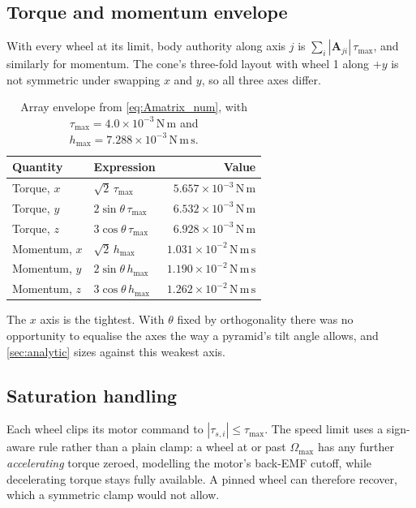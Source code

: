 \documentclass[conference,10pt,a4paper]{IEEEtran}
\newcommand{\mat}[1]{\bm{#1}}
\newcommand{\unit}[1]{\ensuremath{\,\mathrm{#1}}}
\begin{document}
\subsection{Torque and momentum envelope}
\label{sec:envelope}

With every wheel at its limit, body authority along axis $j$ is
$\sum_i|\mat{A}_{ji}|\,\tau_\text{max}$, and similarly for momentum. The
cone's three-fold layout with wheel 1 along $+y$ is not symmetric under
swapping $x$ and $y$, so all three axes differ.

\begin{table}[!t]
\centering
\caption{Array envelope from \cref{eq:Amatrix_num}, with
$\tau_\text{max}=4.0\times10^{-3}\unit{N\,m}$ and
$h_\text{max}=7.288\times10^{-3}\unit{N\,m\,s}$.}
\label{tab:envelope}
\footnotesize
\begin{tabular}{@{}llr@{}}
\toprule
\textbf{Quantity} & \textbf{Expression} & \textbf{Value} \\
\midrule
Torque, $x$   & $\sqrt{2}\,\tau_\text{max}$    & $5.657\times10^{-3}\unit{N\,m}$ \\
Torque, $y$   & $2\sin\theta\,\tau_\text{max}$ & $6.532\times10^{-3}\unit{N\,m}$ \\
Torque, $z$   & $3\cos\theta\,\tau_\text{max}$ & $6.928\times10^{-3}\unit{N\,m}$ \\
Momentum, $x$ & $\sqrt{2}\,h_\text{max}$       & $1.031\times10^{-2}\unit{N\,m\,s}$ \\
Momentum, $y$ & $2\sin\theta\,h_\text{max}$    & $1.190\times10^{-2}\unit{N\,m\,s}$ \\
Momentum, $z$ & $3\cos\theta\,h_\text{max}$    & $1.262\times10^{-2}\unit{N\,m\,s}$ \\
\bottomrule
\end{tabular}
\end{table}

The $x$ axis is the tightest. With $\theta$ fixed by orthogonality there was no
opportunity to equalise the axes the way a pyramid's tilt angle allows, and
\cref{sec:analytic} sizes against this weakest axis.

\subsection{Saturation handling}
\label{sec:sathandling}

Each wheel clips its motor command to $|\tau_{s,i}|\le\tau_\text{max}$. The
speed limit uses a sign-aware rule rather than a plain clamp: a wheel at or
past $\Omega_\text{max}$ has any further \emph{accelerating} torque zeroed,
modelling the motor's back-EMF cutoff, while decelerating torque stays fully
available. A pinned wheel can therefore recover, which a symmetric clamp would
not allow.
\end{document}
